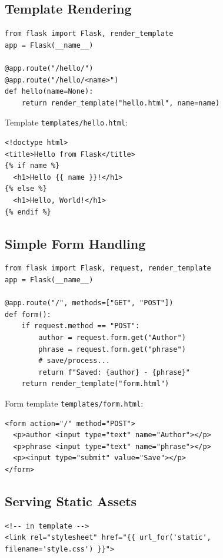 \subsection*{Template Rendering}
\begin{lstlisting}
from flask import Flask, render_template
app = Flask(__name__)

@app.route("/hello/")
@app.route("/hello/<name>")
def hello(name=None):
    return render_template("hello.html", name=name)
\end{lstlisting}

Template \texttt{templates/hello.html}:
\begin{lstlisting}
<!doctype html>
<title>Hello from Flask</title>
{% if name %}
  <h1>Hello {{ name }}!</h1>
{% else %}
  <h1>Hello, World!</h1>
{% endif %}
\end{lstlisting}

\subsection*{Simple Form Handling}
\begin{lstlisting}
from flask import Flask, request, render_template
app = Flask(__name__)

@app.route("/", methods=["GET", "POST"])
def form():
    if request.method == "POST":
        author = request.form.get("Author")
        phrase = request.form.get("phrase")
        # save/process...
        return f"Saved: {author} - {phrase}"
    return render_template("form.html")
\end{lstlisting}

Form template \texttt{templates/form.html}:
\begin{lstlisting}
<form action="/" method="POST">
  <p>author <input type="text" name="Author"></p>
  <p>phrase <input type="text" name="phrase"></p>
  <p><input type="submit" value="Save"></p>
</form>
\end{lstlisting}

\subsection*{Serving Static Assets}
\begin{lstlisting}
<!-- in template -->
<link rel="stylesheet" href="{{ url_for('static', filename='style.css') }}">
\end{lstlisting}

